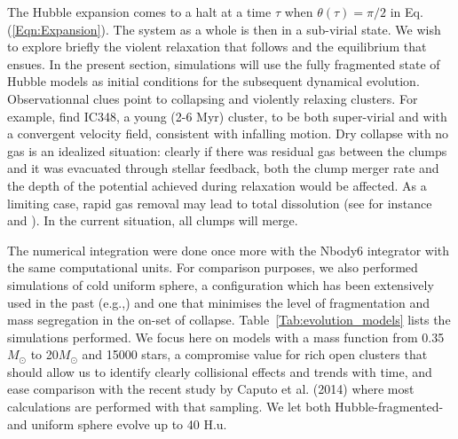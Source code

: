 The Hubble expansion comes to a halt at a time $\tau$ when $\theta(\tau) = \pi/2$  in Eq. (\ref{Eqn:Expansion}). The system as a whole is then in a sub-virial state. We wish to explore briefly the  violent relaxation that follows and the equilibrium that ensues. In the present section, simulations will use the fully fragmented state of Hubble models as initial conditions for the subsequent dynamical evolution. Observationnal clues point to  collapsing and violently relaxing clusters. For example, \cite{Cottaar15} find IC348, a young (2-6 Myr) cluster, to be both super-virial and with a convergent velocity field, consistent with infalling motion. Dry collapse with no gas is an idealized situation: clearly if there was residual gas between the clumps and it was evacuated through stellar feedback, both the clump merger rate and the depth of the potential achieved during relaxation would be affected. As a limiting case, rapid gas removal may lead to total dissolution (see for instance \citealt{Moeckel12} and \citealt{Fujii16}). In the current situation, all clumps will merge.

The numerical integration were done once more with the Nbody6 integrator with the same computational units. For comparison purposes, we also performed simulations of cold uniform sphere, a configuration which has been extensively used  in the past (e.g.,\citealt{Theis99,Boily02,barnes09,caputo14,benhaiem15}) and one that minimises the level of fragmentation and mass segregation in the on-set of collapse. Table~\ref{Tab:evolution_models} lists the simulations performed. We focus here on models with a mass function from 0.35$M_\odot$ to 20$M_\odot$ and 15000 stars, a compromise value for rich open clusters that should allow us to identify clearly collisional effects and trends with time, and ease comparison with the recent study by Caputo et al. (2014) where most calculations are performed with that sampling. We let both Hubble-fragmented- and uniform sphere evolve up to 40 H.u. 

